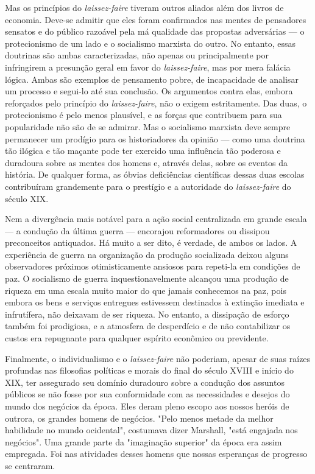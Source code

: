 \documentclass[12pt]{article}
\begin{document}
Mas os princípios do \textit{laissez-faire} tiveram outros aliados além dos livros de economia. Deve-se admitir que eles foram confirmados nas mentes de pensadores sensatos e do público razoável pela má qualidade das propostas adversárias — o protecionismo de um lado e o socialismo marxista do outro. No entanto, essas doutrinas são ambas caracterizadas, não apenas ou principalmente por infringirem a presunção geral em favor do \textit{laissez-faire}, mas por mera falácia lógica. Ambas são exemplos de pensamento pobre, de incapacidade de analisar um processo e segui-lo até sua conclusão. Os argumentos contra elas, embora reforçados pelo princípio do \textit{laissez-faire}, não o exigem estritamente. Das duas, o protecionismo é pelo menos plausível, e as forças que contribuem para sua popularidade não são de se admirar. Mas o socialismo marxista deve sempre permanecer um prodígio para os historiadores da opinião — como uma doutrina tão ilógica e tão maçante pode ter exercido uma influência tão poderosa e duradoura sobre as mentes dos homens e, através delas, sobre os eventos da história. De qualquer forma, as óbvias deficiências científicas dessas duas escolas contribuíram grandemente para o prestígio e a autoridade do \textit{laissez-faire} do século XIX.

Nem a divergência mais notável para a ação social centralizada em grande escala — a condução da última guerra — encorajou reformadores ou dissipou preconceitos antiquados. Há muito a ser dito, é verdade, de ambos os lados. A experiência de guerra na organização da produção socializada deixou alguns observadores próximos otimisticamente ansiosos para repeti-la em condições de paz. O socialismo de guerra inquestionavelmente alcançou uma produção de riqueza em uma escala muito maior do que jamais conhecemos na paz, pois embora os bens e serviços entregues estivessem destinados à extinção imediata e infrutífera, não deixavam de ser riqueza. No entanto, a dissipação de esforço também foi prodigiosa, e a atmosfera de desperdício e de não contabilizar os custos era repugnante para qualquer espírito econômico ou previdente.

Finalmente, o individualismo e o \textit{laissez-faire} não poderiam, apesar de suas raízes profundas nas filosofias políticas e morais do final do século XVIII e início do XIX, ter assegurado seu domínio duradouro sobre a condução dos assuntos públicos se não fosse por sua conformidade com as necessidades e desejos do mundo dos negócios da época. Eles deram pleno escopo aos nossos heróis de outrora, os grandes homens de negócios. "Pelo menos metade da melhor habilidade no mundo ocidental", costumava dizer Marshall, "está engajada nos negócios". Uma grande parte da "imaginação superior" da época era assim empregada. Foi nas atividades desses homens que nossas esperanças de progresso se centraram.
\end{document}
